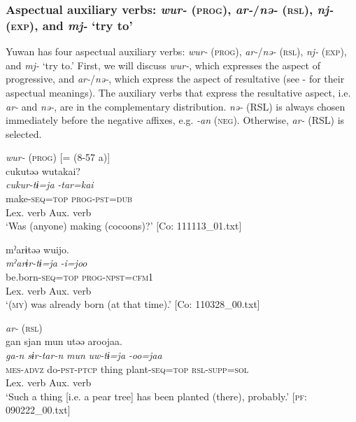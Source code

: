 \subsubsection{Aspectual auxiliary verbs: \textit{wur-} (\textsc{prog}), \textit{ar-}/\textit{nə-} (\textsc{rsl}), \textit{nj-} (\textsc{exp}), and \textit{mj-} ‘try to’}\label{sec:9.1.1.1}

Yuwan has four aspectual auxiliary verbs: \textit{wur-} (\textsc{prog}), \textit{ar-}/\textit{nə-} (\textsc{rsl}), \textit{nj-} (\textsc{exp}), and \textit{mj-} ‘try to.’ First, we will discuss \textit{wur-}, which expresses the aspect of progressive, and \textit{ar-}/\textit{nə-}, which express the aspect of resultative (see  -  for their aspectual meanings). The auxiliary verbs that express the resultative aspect, i.e. \textit{ar-} and \textit{nə-}, are in the complementary distribution. \textit{nə-} (RSL) is always chosen immediately before the negative affixes, e.g. \textit{{}-an} (\textsc{neg}). Otherwise, \textit{ar-} (RSL) is selected.

\ea   \textit{wur-} (\textsc{prog}) \label{ex:9.7}
  \ea \label{ex:9.7a} [= (8-57 a)]\\
   \gllll     cukutəə  wutakai?\\
      \textit{cukur-tɨ=ja}  \textit{-tar=kai}\\
      make-\textsc{seq}=\textsc{top}  \textsc{prog}-\textsc{pst}=\textsc{dub}\\
      {Lex. verb}  {Aux. verb}\\
      \glt       ‘Was (anyone) making (cocoons)?’ [Co: 111113\_01.txt]

\ex \label{ex:9.7b} %
    \gllll  mˀarɨtəə  wuijo.\\
      \textit{mˀarɨr-tɨ=ja}  \textit{-i=joo}\\
      be.born-\textsc{seq}=\textsc{top}  \textsc{prog}-\textsc{npst}=\textsc{cfm}1\\
      {Lex. verb}  {Aux. verb}\\
      \glt       ‘(\textsc{my}) was already born (at that time).’ [Co: 110328\_00.txt]

\ex \textit{ar-} (\textsc{rsl})\label{ex:9.7c}\\
    \gllll     gan  sjan  mun  utəə  aroojaa.\\
      \textit{ga-n}  \textit{sɨr-tar-n}  \textit{mun}  \textit{uw-tɨ=ja}  \textit{-oo=jaa}\\
      \textsc{mes}-\textsc{advz}  do-\textsc{pst}-\textsc{ptcp}  thing  plant-\textsc{seq}=\textsc{top}  \textsc{rsl}-\textsc{supp}=\textsc{sol}\\
      {}  {}  {}  {Lex. verb}  {Aux. verb}\\
      \glt       ‘Such a thing [i.e. a pear tree] has been planted (there), probably.’ [\textsc{pf}: 090222\_00.txt]
  
